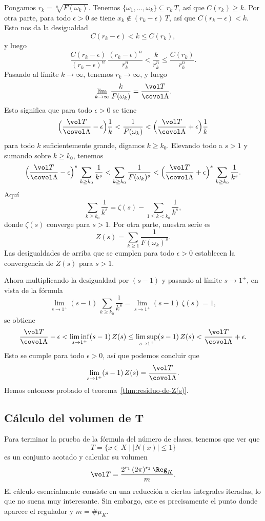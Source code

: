 Pongamos $r_k = \sqrt[n]{F (\omega_k)}$. Tenemos
$\{ \omega_1, \ldots, \omega_k \} \subseteq r_k\,T$, así que $C (r_k) \ge k$.
Por otra parte, para todo $\epsilon > 0$ se tiene
$x_k \notin (r_k - \epsilon)\,T$, así que $C (r_k - \epsilon) < k$. Esto nos
da la desigualdad
$$C (r_k - \epsilon) < k \le C (r_k),$$
y luego
$$\frac{C (r_k - \epsilon)}{(r_k-\epsilon)^n}\,\frac{(r_k - \epsilon)^n}{r_k^n} < \frac{k}{r_k^n} \le \frac{C (r_k)}{r_k^n}.$$
Pasando al límite $k \to \infty$, tenemos $r_k \to \infty$, y luego
$$\lim_{k\to\infty} \frac{k}{F (\omega_k)} = \frac{\vol T}{\covol \Lambda}.$$
Esto significa que para todo $\epsilon > 0$ se tiene
\[ \Bigl(\frac{\vol T}{\covol \Lambda} - \epsilon\Bigr)\frac{1}{k}
   < \frac{1}{F (\omega_k)}
   < \Bigl(\frac{\vol T}{\covol \Lambda} + \epsilon\Bigr)\frac{1}{k} \]
para todo $k$ suficientemente grande, digamos $k \ge k_0$. Elevando todo a $s > 1$
y sumando sobre $k\ge k_0$, tenemos
\[ \Bigl(\frac{\vol T}{\covol \Lambda} - \epsilon\Bigr)^s\,\sum_{k\ge k_0} \frac{1}{k^s}
   < \sum_{k\ge k_0} \frac{1}{F (\omega_k)^s}
   < \Bigl(\frac{\vol T}{\covol \Lambda} + \epsilon\Bigr)^s\,\sum_{k\ge k_0} \frac{1}{k^s}. \]
Aquí
$$\sum_{k\ge k_0} \frac{1}{k^s} = \zeta (s) - \sum_{1\le k < k_0} \frac{1}{k^s},$$
donde $\zeta (s)$ converge para $s > 1$. Por otra parte, nuestra serie es
$$Z (s) = \sum_{k\ge 1} \frac{1}{F (\omega_k)^s}.$$
Las desigualdades de arriba que se cumplen para todo $\epsilon > 0$ establecen
la convergencia de $Z (s)$ para $s > 1$.

Ahora multiplicando la desigualdad por $(s - 1)$ y pasando al límite
$s \to 1^+$, en vista de la fórmula
$$\lim_{s\to 1^+} (s-1)\,\sum_{k\ge k_0} \frac{1}{k^s} = \lim_{s\to 1^+} (s-1)\,\zeta(s) = 1,$$
se obtiene
\[ \frac{\vol T}{\covol \Lambda} - \epsilon
   < \liminf_{s\to 1^+} (s-1)\,Z(s) \le \limsup_{s\to 1^+} (s-1)\,Z(s)
   < \frac{\vol T}{\covol \Lambda} + \epsilon. \]
Esto se cumple para todo $\epsilon > 0$, así que podemos concluir que
$$\lim_{s\to 1^+} (s-1)\,Z (s) = \frac{\vol T}{\covol \Lambda}.$$
Hemos entonces probado el teorema~\ref{thm:residuo-de-Z(s)}.

\subsection{Cálculo del volumen de T}

Para terminar la prueba de la fórmula del número de clases, tenemos que ver que
$$T = \{ x \in X \mid |N (x)| \le 1 \}$$
es un conjunto acotado y calcular su volumen
\begin{equation}
  \label{eq:vol-T}
  \vol T = \frac{2^{r_1}\,(2\pi)^{r_2}\,\Reg_K}{m}.
\end{equation}
El cálculo esencialmente consiste en una reducción a ciertas integrales
iteradas, lo que no suena muy interesante. Sin embargo, este es precisamente
el punto donde aparece el regulador y $m = \# \mu_K$.

